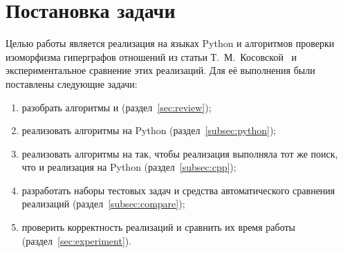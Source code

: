 
\section{Постановка задачи}
\label{sec:task}

Целью работы является реализация на языках Python и \Cpp{} алгоритмов проверки изоморфизма гиперграфов отношений из статьи Т.~М.~Косовской~\cite{KosovskayaIsom} и экспериментальное сравнение этих реализаций.
Для её выполнения были поставлены следующие задачи:
\begin{enumerate}
    \item разобрать алгоритмы \ISOMone{} и \ISOMn{} (раздел~\ref{sec:review});
    \item реализовать алгоритмы на Python (раздел~\ref{subsec:python});
    \item реализовать алгоритмы на \Cpp{} так, чтобы реализация выполняла тот же поиск, что и реализация на Python (раздел~\ref{subsec:cpp});
    \item разработать наборы тестовых задач и средства автоматического сравнения реализаций (раздел~\ref{subsec:compare});
    \item проверить корректность реализаций и сравнить их время работы (раздел~\ref{sec:experiment}).
\end{enumerate}
